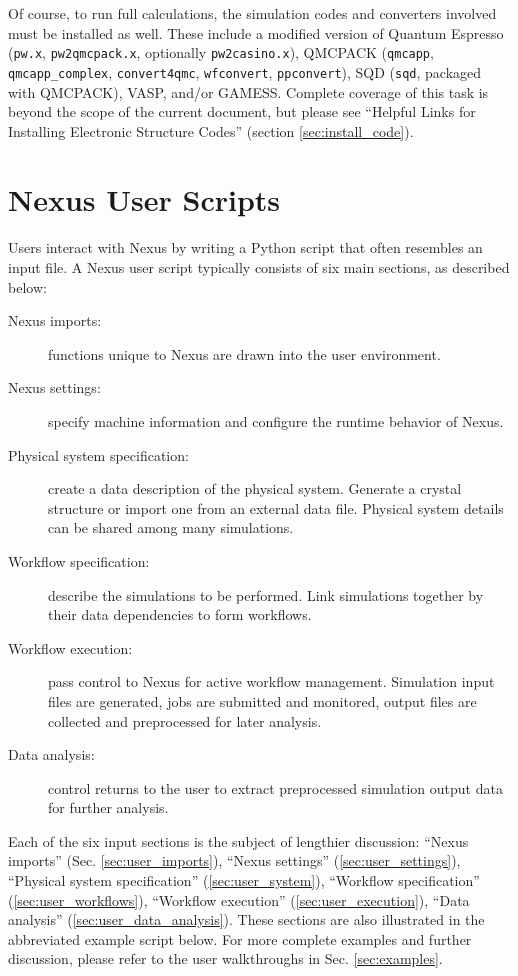 \documentclass[oneside,11pt]{memoir}
\numberwithin{equation}{section}
\begin{document}
Of course, to run full calculations, the simulation codes and converters 
involved must be installed as well.  These include a modified version of 
Quantum Espresso (\texttt{pw.x}, \texttt{pw2qmcpack.x}, optionally 
\texttt{pw2casino.x}), QMCPACK (\texttt{qmcapp}, \texttt{qmcapp\_complex}, \texttt{convert4qmc}, \texttt{wfconvert}, \texttt{ppconvert}), 
SQD (\texttt{sqd}, packaged with QMCPACK), VASP, and/or GAMESS.  
Complete coverage of this task is beyond the scope of the current document, but 
please see ``Helpful Links for Installing Electronic Structure Codes'' 
(section \ref{sec:install_code}).






\pagebreak
\chapter{Nexus User Scripts} \label{sec:user_scripts}

Users interact with Nexus by writing a Python script that often resembles an input file.  A Nexus user script typically consists of six main sections, as described below:

\begin{description}
  \item[Nexus imports:] functions unique to Nexus are drawn into the user environment.
  \item[Nexus settings:] specify machine information and configure the runtime behavior of Nexus.
  \item[Physical system specification:]  create a data description of the physical system.  Generate a crystal structure or import one from an external data file.  Physical system details can be shared among many simulations.
  \item[Workflow specification:] describe the simulations to be performed.  Link simulations together by their data dependencies to form workflows.
  \item[Workflow execution:] pass control to Nexus for active workflow management.  Simulation input files are generated, jobs are submitted and monitored, output files are collected and preprocessed for later analysis.
  \item[Data analysis:] control returns to the user to extract preprocessed simulation output data for further analysis. 
\end{description}


Each of the six input sections is the subject of lengthier discussion: ``Nexus imports'' (Sec. \ref{sec:user_imports}), ``Nexus settings'' (\ref{sec:user_settings}), ``Physical system specification'' (\ref{sec:user_system}),  ``Workflow specification'' (\ref{sec:user_workflows}), ``Workflow execution'' (\ref{sec:user_execution}), ``Data analysis'' (\ref{sec:user_data_analysis}).  These sections are also illustrated in the abbreviated example script below.  For more complete examples and further discussion, please refer to the user walkthroughs in Sec. \ref{sec:examples}.
\end{document}

